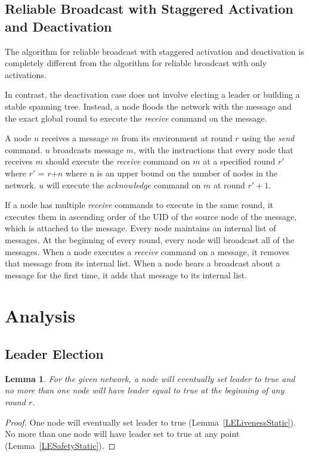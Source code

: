\documentclass[english]{article}
\newtheorem{lemma}[theorem]{Lemma}
\begin{document}
  \subsection {Reliable Broadcast with Staggered Activation and Deactivation}

The algorithm for reliable broadcast with staggered activation and deactivation is completely different from the algorithm for reliable broadcast with only activations. 


In contrast, the deactivation case does not involve electing a leader or building a stable spanning tree. Instead, a node floods the network with the message and the exact global round to execute the \textit{receive} command on the message.


A node $u$ receives a message $m$ from its environment at round $r$ using the \textit{send} command. $u$ broadcasts message $m$, with the instructions that every node that receives $m$ should execute the \textit{receive} command on $m$ at a specified round $r'$ where $r'$ = $r$+$n$ where n is an upper bound on the number of nodes in the network. $u$ will execute the \textit{acknowledge} command on $m$ at round $r' + 1$.

If a node has multiple \textit{receive} commands to execute in the same round, it executes them in ascending order of the UID of the source node of the message, which is attached to the message. Every node maintains an internal list of messages. At the beginning of every round, every node will broadcast all of the messages. When a node executes a \textit{receive} command on a message, it removes that message from its internal list.  When a node hears a broadcast about a message for the first time, it adds that message to its internal list.


\section{Analysis}

\subsection{Leader Election}

\begin{lemma}
\label{LeaderElectionStatic}
For the given network, a node will eventually set leader to true and no more than one node will have leader equal to true at the beginning of any round $r$. 
\end{lemma}
\begin{proof}
One node will eventually set leader to true (Lemma~\ref{LELivenessStatic}).
No more than one node will have leader set to true at any point (Lemma~\ref{LESafetyStatic}).
\end{proof}
\end{document}
